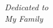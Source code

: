 
\vspace*{\fill}

\begin{center}
{\it Dedicated to}\\
{\it My Family}
\end{center}

\vspace*{\fill}
